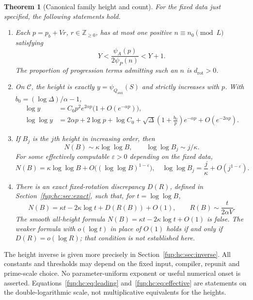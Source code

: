 \documentclass[11pt,letterpaper]{article}
\newtheorem{theorem}{Theorem}[section]
\theoremstyle{definition}\newtheorem{definition}[theorem]{Definition}
\theoremstyle{remark}\newtheorem{remark}[theorem]{Remark}
\newcommand{\Z}{\mathbb Z}\newcommand{\Np}{\mathbb Z_{>0}}
\newcommand{\qaux}{Q_{\mathrm{aux}}}
\newcommand{\drot}{d_{\mathrm{rot}}}
\begin{document}
\begin{theorem}[Canonical family height and count]\label{fup:hc:thm:main}
For the fixed data just specified, the following statements hold.
\begin{enumerate}[label=\textup{(\roman*)}]
\item Each $p=p_b+Vr$, $r\in\Z_{\ge0}$, has at most one positive $n\equiv n_0\pmod L$ satisfying
\begin{equation}\label{fup:hc:eq:ratio}
 Y<\frac{\psi_A(p)}{2\psi_P(n)}<Y+1.
\end{equation}
The proportion of progression terms admitting such an $n$ is $\drot>0$.
\item On $\mathcal C$, the height is exactly $y=\psi_{\qaux}(S)$ and strictly increases with $p$. With $b_0=(\log\Delta)/\alpha-1$,
\begin{align}\label{fup:hc:eq:heightmain}
 \log y&=C_0p^2e^{2\alpha p}\bigl(1+O(e^{-\alpha p})\bigr),\\
 \log\log y&=2\alpha p+2\log p+\log C_0
   +\sqrt\Delta\left(1+\frac{b_0}{p}\right)e^{-\alpha p}
   +O(e^{-2\alpha p}).\label{fup:hc:eq:heightfine}
\end{align}
\item If $B_j$ is the $j$th height in increasing order, then
\begin{equation}\label{fup:hc:eq:leading}
 N(B)\sim\kappa\log\log B,\qquad
 \log\log B_j\sim j/\kappa.
\end{equation}
For some effectively computable $\varepsilon>0$ depending on the fixed data,
\begin{equation}\label{fup:hc:eq:effective}
 N(B)=\kappa\log\log B+O\bigl((\log\log B)^{1-\varepsilon}\bigr),\quad
 \log\log B_j=\frac j\kappa+O(j^{1-\varepsilon}).
\end{equation}
\item There is an exact fixed-rotation discrepancy $D(R)$, defined in Section~\ref{fup:hc:sec:exact}, such that, for $t=\log\log B$,
\begin{equation}\label{fup:hc:eq:decomposition}
 N(B)=\kappa t-2\kappa\log t+D(R(B))+O(1),\qquad
 R(B)\sim\frac{t}{2\alpha V}.
\end{equation}
The smooth all-height formula $N(B)=\kappa t-2\kappa\log t+O(1)$ is false. The weaker formula with $o(\log t)$ in place of $O(1)$ holds if and only if $D(R)=o(\log R)$; that condition is not established here.
\end{enumerate}
\end{theorem}
The height inverse is given more precisely in Section~\ref{fup:hc:sec:inverse}. All constants and thresholds may depend on the fixed input, compiler, repunit and prime-scale choice. No parameter-uniform exponent or useful numerical onset is asserted. Equations~\eqref{fup:hc:eq:leading} and~\eqref{fup:hc:eq:effective} are statements on the double-logarithmic scale, not multiplicative equivalents for the heights.
\end{document}
